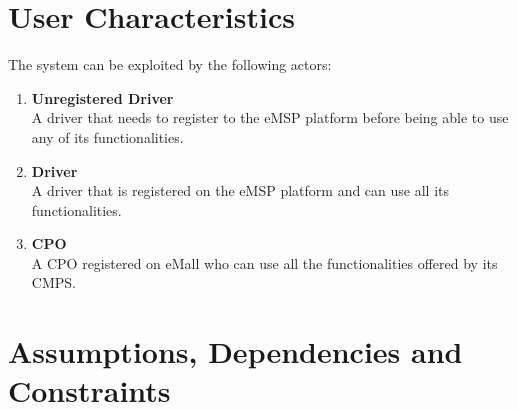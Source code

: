 \section{User Characteristics} %
The system can be exploited by the following actors:
\label{sec:userCharacteristics}
\begin{enumerate}
\item \textbf{Unregistered Driver}\\
A driver that needs to register to the eMSP platform before being able to use any of its functionalities.
\item \textbf{Driver}\\
A driver that is registered on the eMSP platform and can use all its functionalities.
\item \textbf{CPO}\\
A CPO registered on eMall who can use all the functionalities offered by its CMPS.
\end{enumerate}

\newpage
\section{Assumptions, Dependencies and Constraints}
\label{sec:assumptionsDependenciesConstraints}

